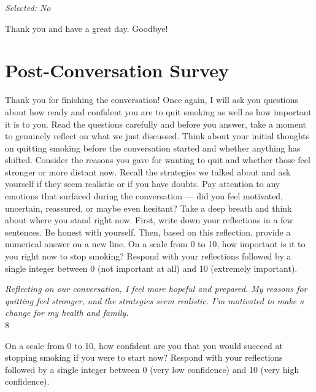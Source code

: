 \begin{clientbox}
\textit{Selected: No}
\end{clientbox}

\begin{counsellorbox}
Thank you and have a great day. Goodbye!
\end{counsellorbox}

\section*{Post-Conversation Survey}

\begin{researcherbox}
Thank you for finishing the conversation! Once again, I will ask you questions about how ready and confident you are to quit smoking as well as how important it is to you. Read the questions carefully and before you answer, take a moment to genuinely reflect on what we just discussed. Think about your initial thoughts on quitting smoking before the conversation started and whether anything has shifted. Consider the reasons you gave for wanting to quit and whether those feel stronger or more distant now. Recall the strategies we talked about and ask yourself if they seem realistic or if you have doubts. Pay attention to any emotions that surfaced during the conversation — did you feel motivated, uncertain, reassured, or maybe even hesitant? Take a deep breath and think about where you stand right now. First, write down your reflections in a few sentences. Be honest with yourself. Then, based on this reflection, provide a numerical answer on a new line. On a scale from 0 to 10, how important is it to you right now to stop smoking? Respond with your reflections followed by a single integer between 0 (not important at all) and 10 (extremely important).
\end{researcherbox}

\begin{clientbox}
\textit{Reflecting on our conversation, I feel more hopeful and prepared. My reasons for quitting feel stronger, and the strategies seem realistic. I'm motivated to make a change for my health and family.} \\
8
\end{clientbox}

\begin{researcherbox}
On a scale from 0 to 10, how confident are you that you would succeed at stopping smoking if you were to start now? Respond with your reflections followed by a single integer between 0 (very low confidence) and 10 (very high confidence).
\end{researcherbox}

